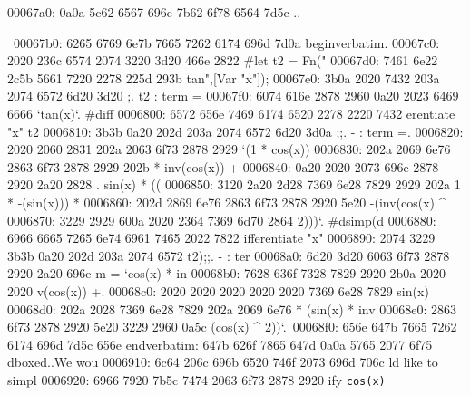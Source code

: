 \begin{bo
00010e0: 7865 647d 5c62 6567 696e 7b76 6572 6261  xed}
\begin{verba
00010f0: 7469 6d7d 0a20 2023 7479 7065 2074 6572  tim}
\begin{
0001c40: 7665 7262 6174 696d 7d0a 2020 236c 6574  verbatim}
\begin{boxe
00027a0: 647d 5c62 6567 696e 7b76 6572 6261 7469  d}
\begin{verbati
00027b0: 6d7d 0a20 2023 6c65 7420 696e 6669 7865  m}
\begin{v
0002c60: 6572 6261 7469 6d7d 0a20 2023 6c65 7420  erbatim}
\begin{
0002dc0: 7665 7262 6174 696d 7d0a 2020 236c 6574  verbatim}
\begin{boxed
0002f30: 7d5c 6265 6769 6e7b 7665 7262 6174 696d  }
\begin{verbatim
0002f40: 7d0a 2020 236c 6574 2068 6428 683a 3a74  }
\begin{v
0003e60: 6572 6261 7469 6d7d 0a20 2023 236f 7065  erbatim}
\begin{boxed
00042b0: 7d5c 6265 6769 6e7b 7665 7262 6174 696d  }
\begin{verbatim
00042c0: 7d0a 2020 2328 782c 7429 3b3b 0a20 202d  }
\begin{boxed}
00067a0: 0a0a 5c62 6567 696e 7b62 6f78 6564 7d5c  ..\begin{boxed}\
00067b0: 6265 6769 6e7b 7665 7262 6174 696d 7d0a  begin{verbatim}.
00067c0: 2020 236c 6574 2074 3220 3d20 466e 2822    #let t2 = Fn("
00067d0: 7461 6e22 2c5b 5661 7220 2278 225d 293b  tan",[Var "x"]);
00067e0: 3b0a 2020 7432 203a 2074 6572 6d20 3d20  ;.  t2 : term = 
00067f0: 6074 616e 2878 2960 0a20 2023 6469 6666  `tan(x)`.  #diff
0006800: 6572 656e 7469 6174 6520 2278 2220 7432  erentiate "x" t2
0006810: 3b3b 0a20 202d 203a 2074 6572 6d20 3d0a  ;;.  - : term =.
0006820: 2020 2060 2831 202a 2063 6f73 2878 2929     `(1 * cos(x))
0006830: 202a 2069 6e76 2863 6f73 2878 2929 202b   * inv(cos(x)) +
0006840: 0a20 2020 2073 696e 2878 2920 2a20 2828  .    sin(x) * ((
0006850: 3120 2a20 2d28 7369 6e28 7829 2929 202a  1 * -(sin(x))) *
0006860: 202d 2869 6e76 2863 6f73 2878 2920 5e20   -(inv(cos(x) ^ 
0006870: 3229 2929 600a 2020 2364 7369 6d70 2864  2)))`.  #dsimp(d
0006880: 6966 6665 7265 6e74 6961 7465 2022 7822  ifferentiate "x"
0006890: 2074 3229 3b3b 0a20 202d 203a 2074 6572   t2);;.  - : ter
00068a0: 6d20 3d20 6063 6f73 2878 2920 2a20 696e  m = `cos(x) * in
00068b0: 7628 636f 7328 7829 2920 2b0a 2020 2020  v(cos(x)) +.    
00068c0: 2020 2020 2020 2020 2020 7369 6e28 7829            sin(x)
00068d0: 202a 2028 7369 6e28 7829 202a 2069 6e76   * (sin(x) * inv
00068e0: 2863 6f73 2878 2920 5e20 3229 2960 0a5c  (cos(x) ^ 2))`.\
00068f0: 656e 647b 7665 7262 6174 696d 7d5c 656e  end{verbatim}\en
0006900: 647b 626f 7865 647d 0a0a 5765 2077 6f75  d{boxed}..We wou
0006910: 6c64 206c 696b 6520 746f 2073 696d 706c  ld like to simpl
0006920: 6966 7920 7b5c 7474 2063 6f73 2878 2920  ify {\tt cos(x) 
}
\end{boxed}
\end{boxed}
\end{verbatim
00042c0: 7d0a 2020 2328 782c 7429 3b3b 0a20 202d  }
\end{boxed
00042b0: 7d5c 6265 6769 6e7b 7665 7262 6174 696d  }
\end{v
0003e60: 6572 6261 7469 6d7d 0a20 2023 236f 7065  erbatim}
\end{verbatim
0002f40: 7d0a 2020 236c 6574 2068 6428 683a 3a74  }
\end{boxed
0002f30: 7d5c 6265 6769 6e7b 7665 7262 6174 696d  }
\end{
0002dc0: 7665 7262 6174 696d 7d0a 2020 236c 6574  verbatim}
\end{v
0002c60: 6572 6261 7469 6d7d 0a20 2023 6c65 7420  erbatim}
\end{verbati
00027b0: 6d7d 0a20 2023 6c65 7420 696e 6669 7865  m}
\end{boxe
00027a0: 647d 5c62 6567 696e 7b76 6572 6261 7469  d}
\end{
0001c40: 7665 7262 6174 696d 7d0a 2020 236c 6574  verbatim}
\end{verba
00010f0: 7469 6d7d 0a20 2023 7479 7065 2074 6572  tim}
\end{bo
00010e0: 7865 647d 5c62 6567 696e 7b76 6572 6261  xed}
